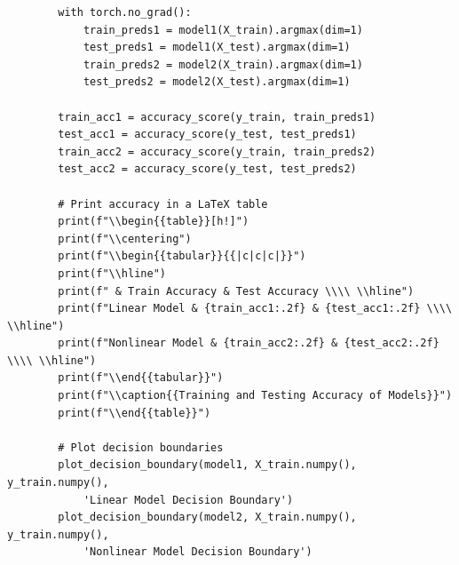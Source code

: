 \documentclass[11pt, oneside]{article}   	%
\begin{document}
\begin{verbatim}
        with torch.no_grad():
            train_preds1 = model1(X_train).argmax(dim=1)
            test_preds1 = model1(X_test).argmax(dim=1)
            train_preds2 = model2(X_train).argmax(dim=1)
            test_preds2 = model2(X_test).argmax(dim=1)
        
        train_acc1 = accuracy_score(y_train, train_preds1)
        test_acc1 = accuracy_score(y_test, test_preds1)
        train_acc2 = accuracy_score(y_train, train_preds2)
        test_acc2 = accuracy_score(y_test, test_preds2)
        
        # Print accuracy in a LaTeX table
        print(f"\\begin{{table}}[h!]")
        print(f"\\centering")
        print(f"\\begin{{tabular}}{{|c|c|c|}}")
        print(f"\\hline")
        print(f" & Train Accuracy & Test Accuracy \\\\ \\hline")
        print(f"Linear Model & {train_acc1:.2f} & {test_acc1:.2f} \\\\ \\hline")
        print(f"Nonlinear Model & {train_acc2:.2f} & {test_acc2:.2f} \\\\ \\hline")
        print(f"\\end{{tabular}}")
        print(f"\\caption{{Training and Testing Accuracy of Models}}")
        print(f"\\end{{table}}")
        
        # Plot decision boundaries
        plot_decision_boundary(model1, X_train.numpy(), y_train.numpy(), 
            'Linear Model Decision Boundary')
        plot_decision_boundary(model2, X_train.numpy(), y_train.numpy(), 
            'Nonlinear Model Decision Boundary')
\end{verbatim}
\end{document}
